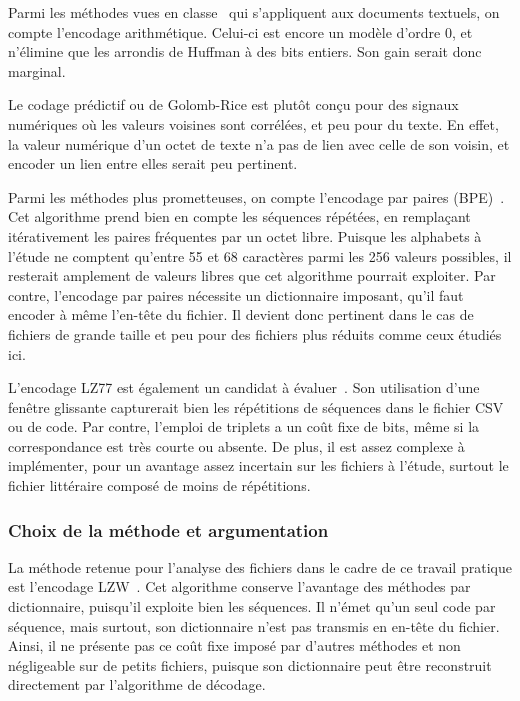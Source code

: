 \documentclass[12pt,letterpaper]{article}
\begin{document}
Parmi les méthodes vues en classe~\cite{notesCours} qui s'appliquent aux documents textuels, on compte l'encodage arithmétique.
Celui-ci est encore un modèle d'ordre 0, et n'élimine que les arrondis de Huffman à des bits entiers. Son gain serait donc marginal. 

Le codage prédictif ou de Golomb-Rice est plutôt conçu pour des signaux numériques où les valeurs voisines sont corrélées, et peu pour du texte.
En effet, la valeur numérique d'un octet de texte n'a pas de lien avec celle de son voisin, et encoder un lien entre elles serait peu pertinent.

Parmi les méthodes plus prometteuses, on compte l'encodage par paires (BPE)~\cite{gage1994}.
Cet algorithme prend bien en compte les séquences répétées, en remplaçant itérativement les paires fréquentes par un octet libre.
Puisque les alphabets à l'étude ne comptent qu'entre 55 et 68 caractères parmi les 256 valeurs possibles, il resterait amplement de valeurs libres que cet algorithme pourrait exploiter.
Par contre, l'encodage par paires nécessite un dictionnaire imposant, qu'il faut encoder à même l'en-tête du fichier.
Il devient donc pertinent dans le cas de fichiers de grande taille et peu pour des fichiers plus réduits comme ceux étudiés ici.

L'encodage LZ77 est également un candidat à évaluer~\cite{ziv1977}. 
Son utilisation d'une fenêtre glissante capturerait bien les répétitions de séquences dans le fichier CSV ou de code.
Par contre, l'emploi de triplets a un coût fixe de bits, même si la correspondance est très courte ou absente.
De plus, il est assez complexe à implémenter, pour un avantage assez incertain sur les fichiers à l'étude, surtout le fichier littéraire composé de moins de répétitions.

\subsubsection*{Choix de la méthode et argumentation}

La méthode retenue pour l'analyse des fichiers dans le cadre de ce travail pratique est l'encodage LZW~\cite{welch1984}.
Cet algorithme conserve l'avantage des méthodes par dictionnaire, puisqu'il exploite bien les séquences.
Il n'émet qu'un seul code par séquence, mais surtout, son dictionnaire n'est pas transmis en en-tête du fichier.
Ainsi, il ne présente pas ce coût fixe imposé par d'autres méthodes et non négligeable sur de petits fichiers, puisque son dictionnaire peut être reconstruit directement par l'algorithme de décodage.
\end{document}
